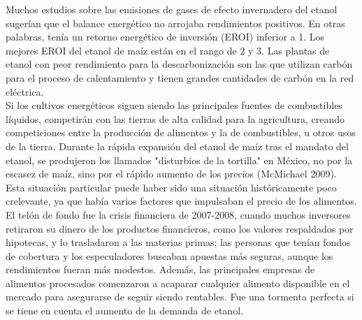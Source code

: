 \documentclass[runningheads]{llncs}
\begin{document}
Muchos estudios sobre las emisiones de gases de efecto invernadero del etanol sugerían que el balance energético no arrojaba rendimientos positivos. En otras palabras, tenía un retorno energético de inversión (EROI) inferior a 1. Los mejores EROI del etanol de maíz están en el rango de 2 y 3. Las plantas de etanol con peor rendimiento para la descarbonización son las que utilizan carbón para el proceso de calentamiento y tienen grandes cantidades de carbón en la red eléctrica. \\

Si los cultivos energéticos siguen siendo las principales fuentes de combustibles líquidos, competirán con las tierras de alta calidad para la agricultura, creando competiciones entre la producción de alimentos y la de combustibles, u otros usos de la tierra. Durante la rápida expansión del etanol de maíz tras el mandato del etanol, se produjeron los llamados "disturbios de la tortilla" en México, no por la escasez de maíz, sino por el rápido aumento de los precios (McMichael 2009). Esta situación particular puede haber sido una situación históricamente poco crelevante, ya que había varios factores que impulsaban el precio de los alimentos. El telón de fondo fue la crisis financiera de 2007-2008, cuando muchos inversores retiraron su dinero de los productos financieros, como los valores respaldados por hipotecas, y lo trasladaron a las materias primas; las personas que tenían fondos de cobertura y los especuladores buscaban apuestas más seguras, aunque los rendimientos fueran más modestos. Además, las principales empresas de alimentos procesados comenzaron a acaparar cualquier alimento disponible en el mercado para asegurarse de seguir siendo rentables. Fue una tormenta perfecta si se tiene en cuenta el aumento de la demanda de etanol. \\













\end{document}
